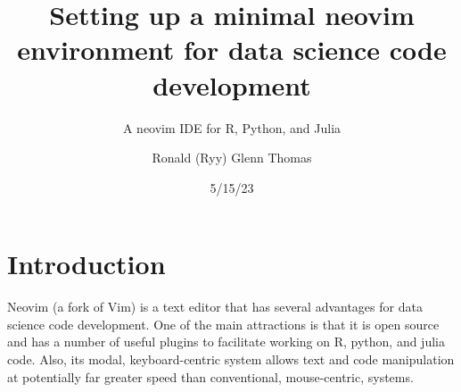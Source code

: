 \documentclass[
  letterpaper,
  DIV=11,
  numbers=noendperiod,
  oneside]{scrartcl}
\title{Setting up a minimal neovim environment for data science code
development}
\subtitle{A neovim IDE for R, Python, and Julia}
\author{Ronald (Ryy) Glenn Thomas}
\date{5/15/23}
\renewcommand*\contentsname{Table of contents}
\newcommand\contentsname{Table of contents}
\begin{document}
\maketitle
\ifdefined\Shaded\renewenvironment{Shaded}{\begin{tcolorbox}[sharp corners, breakable, interior hidden, enhanced, frame hidden, borderline west={3pt}{0pt}{shadecolor}, boxrule=0pt]}{\end{tcolorbox}}\fi

\renewcommand*\contentsname{Table of contents}
{
\hypersetup{linkcolor=}
\setcounter{tocdepth}{3}
\tableofcontents
}

\hypertarget{introduction}{%
\section{Introduction}\label{introduction}}

Neovim (a fork of Vim) is a text editor that has several advantages for
data science code development. One of the main attractions is that it is
open source and has a number of useful plugins to facilitate working on
R, python, and julia code. Also, its modal, keyboard-centric system
allows text and code manipulation at potentially far greater speed than
conventional, mouse-centric, systems.
\end{document}
